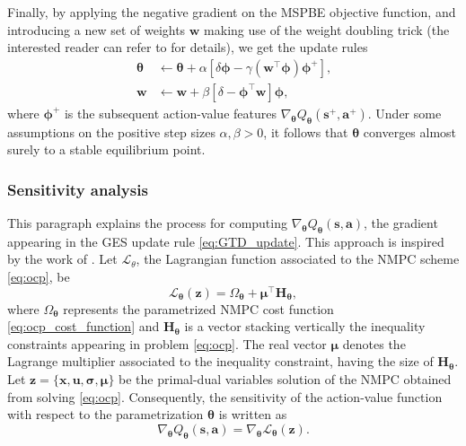 \documentclass[letterpaper, 10pt, conference]{ieeeconf}
\begin{document}
Finally, by applying the negative gradient on the MSPBE objective function, and introducing a new set of weights $\mathbf{w}$ making use of the weight doubling trick (the interested reader can refer to \cite{sutton2009fast,maei2009convergent,maei2010toward} for details), 
we get the update rules
	\begin{equation}\label{eq:GTD_update}
		\begin{aligned}
			\boldsymbol{\theta} & \leftarrow \boldsymbol{\theta} + \alpha\left[\delta\boldsymbol{\phi} - \gamma\left(\mathbf{w}^{\top}\boldsymbol{\phi}\right) \boldsymbol{\phi}^{+}\right]\text{,}\\
			\mathbf{w} & \leftarrow \mathbf{w}+\beta\left[\delta - \boldsymbol{\phi}^{\top}\mathbf{w}\right]\boldsymbol{\phi}\text{,}
		\end{aligned}
	\end{equation}
where $\boldsymbol{\phi}^{+}$ is the subsequent action-value features $\nabla_{\boldsymbol{\theta}}Q_{\boldsymbol{\theta}}(\mathbf{s}^+,\mathbf{a}^+)$.
Under some assumptions \cite{maei2010toward} on the positive step sizes $\alpha,\beta > 0$, it follows that $\boldsymbol{\theta}$ converges almost surely to a stable equilibrium point. 

		\subsubsection{\textbf{Sensitivity analysis}}

This paragraph explains the process for computing $\nabla_{\boldsymbol{\theta}}Q_{\boldsymbol{\theta}}(\mathbf{s}, \mathbf{a})$, the gradient appearing in the GES update rule \eqref{eq:GTD_update}.
This approach is inspired by the work of \cite{gros2019data}.
Let $\mathcal{\mathcal{L}_\theta}$, the Lagrangian function associated to the NMPC scheme \eqref{eq:ocp}, be
	\begin{equation} \label{eq:lagrange}
		\mathcal{L}_{\boldsymbol{\theta}}(\mathbf{z}) = \Omega_{\boldsymbol{\theta}}+\boldsymbol{\mu}^{\top}\mathbf{H}_{\boldsymbol{\theta}},
	\end{equation}
where $\Omega_{\boldsymbol{\theta}}$ represents the parametrized NMPC cost function \eqref{eq:ocp_cost_function} and $\mathbf{H}_{\boldsymbol{\theta}}$ is a vector stacking vertically the inequality constraints appearing in problem \eqref{eq:ocp}.
The real vector $\boldsymbol{\mu}$ denotes the Lagrange multiplier associated to the inequality constraint, having the size of $\mathbf{H}_{\boldsymbol{\theta}}$.
Let $\mathbf{z} = \{\mathbf{x},\mathbf{u},\boldsymbol{\sigma},\boldsymbol{\mu}\}$ be the primal-dual variables solution of the NMPC obtained from solving \eqref{eq:ocp}.
Consequently, the sensitivity of the action-value function with respect to the parametrization $\boldsymbol{\theta}$ is written as
\begin{equation} \label{eq:lagrange}
	\nabla_{\boldsymbol{\theta}}Q_{\boldsymbol{\theta}}(\mathbf{s}, \mathbf{a})= \nabla_{\boldsymbol{\theta}}\mathcal{L}_{\boldsymbol{\theta}}(\mathbf{z}).
\end{equation}
\end{document}
